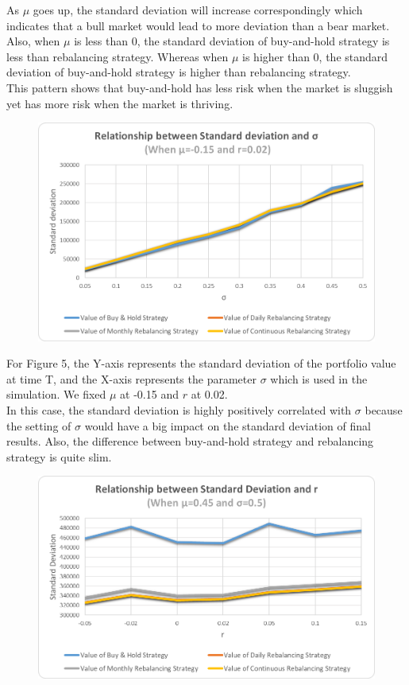 \documentclass[
10pt, %
a4paper, %
oneside, %
headinclude,footinclude, %
BCOR5mm, %
]{scrartcl}
\begin{document}
As $\mu$ goes up, the standard deviation will increase correspondingly which indicates that a bull market would lead to more deviation than a bear market.  Also, when $\mu$ is less than 0, the standard deviation of buy-and-hold strategy is less than rebalancing strategy. Whereas when $\mu$ is higher than 0, the standard deviation of buy-and-hold strategy is higher than rebalancing strategy.\\ 

This pattern shows that buy-and-hold has less risk when the market is sluggish yet has more risk when the market is thriving. \\

\begin{figure}[H]
	\centering
	\includegraphics[width=0.7\linewidth]{std_sigma_-015_002}
	\caption{}
	\label{fig:stdsigma-015002}
\end{figure}

For Figure 5, the Y-axis represents the standard deviation of the portfolio value at time T, and the X-axis represents the parameter $\sigma$ which is used in the simulation. We fixed $\mu$ at -0.15 and $r$ at 0.02.\\

In this case, the standard deviation is highly positively correlated with $\sigma$ because the setting of $\sigma$ would have a big impact on the standard deviation of final results. Also, the difference between buy-and-hold strategy and rebalancing strategy is quite slim. \\


\begin{figure}[H]
	\centering
	\includegraphics[width=0.7\linewidth]{std_r_045_050}
	\caption{}
	\label{fig:stdr045050}
\end{figure}
\end{document}

